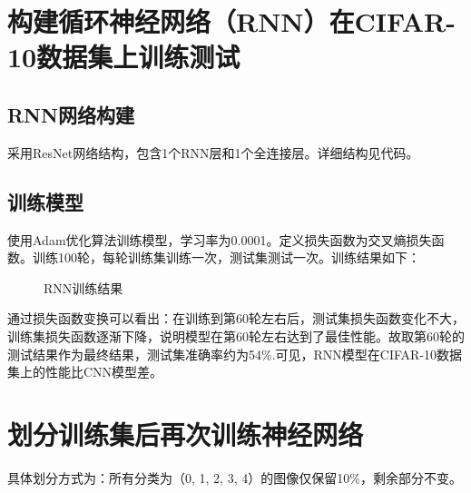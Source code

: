 \documentclass[UTF8,a4paper,12pt]{ctexart}
\begin{document}
\section{构建循环神经网络（RNN）在CIFAR-10数据集上训练测试}

\subsection{RNN网络构建}
采用ResNet网络结构，包含1个RNN层和1个全连接层。详细结构见代码。

\subsection{训练模型}
使用Adam优化算法训练模型，学习率为0.0001。定义损失函数为交叉熵损失函数。训练100轮，每轮训练集训练一次，测试集测试一次。训练结果如下：

\begin{figure}[H]
    \centering
    \caption{RNN训练结果}
\end{figure}
 
通过损失函数变换可以看出：在训练到第60轮左右后，测试集损失函数变化不大，训练集损失函数逐渐下降，说明模型在第60轮左右达到了最佳性能。故取第60轮的测试结果作为最终结果，测试集准确率约为54\%.可见，RNN模型在CIFAR-10数据集上的性能比CNN模型差。

\section{划分训练集后再次训练神经网络}
具体划分方式为：所有分类为（0, 1, 2, 3, 4）的图像仅保留10\%，剩余部分不变。
\end{document}
